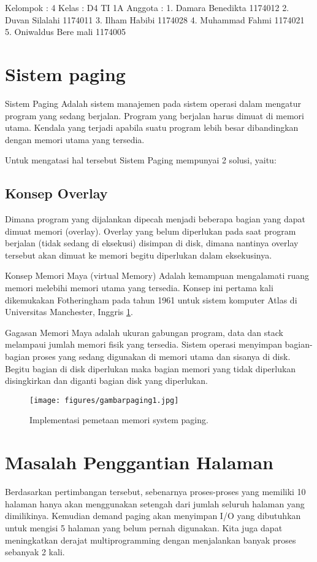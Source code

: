 
Kelompok : 4
Kelas : D4 TI 1A
Anggota : 
1. Damara Benedikta		1174012
2. Duvan Silalahi 		1174011
3. Ilham Habibi			1174028
4. Muhammad Fahmi		1174021
5. Oniwaldus Bere mali	1174005


\section { Sistem paging }
Sistem Paging Adalah sistem manajemen pada sistem operasi dalam mengatur program yang sedang berjalan. Program yang berjalan harus dimuat di memori utama. Kendala yang terjadi apabila suatu program lebih besar dibandingkan dengan memori utama yang tersedia.

Untuk mengatasi hal tersebut Sistem Paging mempunyai 2 solusi, yaitu:

\subsection {Konsep Overlay}
Dimana program yang dijalankan dipecah menjadi beberapa bagian yang dapat dimuat memori (overlay). Overlay yang belum diperlukan pada saat program berjalan (tidak sedang di eksekusi) disimpan di disk, dimana nantinya overlay tersebut akan dimuat ke memori begitu diperlukan dalam eksekusinya.

Konsep Memori Maya (virtual Memory)
Adalah kemampuan mengalamati ruang memori melebihi memori utama yang tersedia. Konsep ini pertama kali dikemukakan Fotheringham pada tahun 1961 untuk sistem komputer Atlas di Universitas Manchester, Inggris \ref{Gambar1}.

Gagasan Memori Maya adalah ukuran gabungan program, data dan stack melampaui jumlah memori fisik yang tersedia. Sistem operasi menyimpan bagian-bagian proses yang sedang digunakan di memori utama dan sisanya di disk. Begitu bagian di disk diperlukan maka bagian memori yang tidak diperlukan disingkirkan dan diganti bagian disk yang diperlukan.


	\begin{figure}[ht]
	\centerline{\texttt{[image: figures/gambarpaging1.jpg]}}
	\caption{Implementasi pemetaan memori system paging.}
	\label{Gambar1}
	\end{figure}

\section {Masalah Penggantian Halaman}

Berdasarkan pertimbangan tersebut, sebenarnya proses-proses yang memiliki 10 halaman hanya akan menggunakan setengah dari jumlah seluruh halaman yang dimilikinya. Kemudian demand paging akan menyimpan I/O yang dibutuhkan untuk mengisi 5 halaman yang belum pernah digunakan. Kita juga dapat meningkatkan derajat multiprogramming dengan menjalankan banyak proses sebanyak 2 kali.

